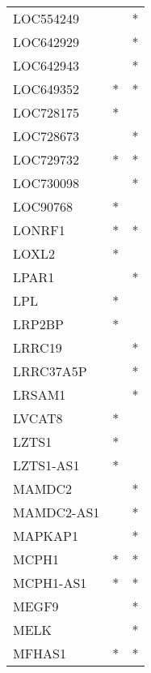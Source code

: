 \begin{longtable}{lcc}
LOC554249             &                &          * \\
LOC642929             &                &          * \\
LOC642943             &                &          * \\
LOC649352             &              * &          * \\
LOC728175             &              * &            \\
LOC728673             &                &          * \\
LOC729732             &              * &          * \\
LOC730098             &                &          * \\
LOC90768              &              * &            \\
LONRF1                &              * &          * \\
LOXL2                 &              * &            \\
LPAR1                 &                &          * \\
LPL                   &              * &            \\
LRP2BP                &              * &            \\
LRRC19                &                &          * \\
LRRC37A5P             &                &          * \\
LRSAM1                &                &          * \\
LVCAT8                &              * &            \\
LZTS1                 &              * &            \\
LZTS1-AS1             &              * &            \\
MAMDC2                &                &          * \\
MAMDC2-AS1            &                &          * \\
MAPKAP1               &                &          * \\
MCPH1                 &              * &          * \\
MCPH1-AS1             &              * &          * \\
MEGF9                 &                &          * \\
MELK                  &                &          * \\
MFHAS1                &              * &          * \\

\end{longtable}
